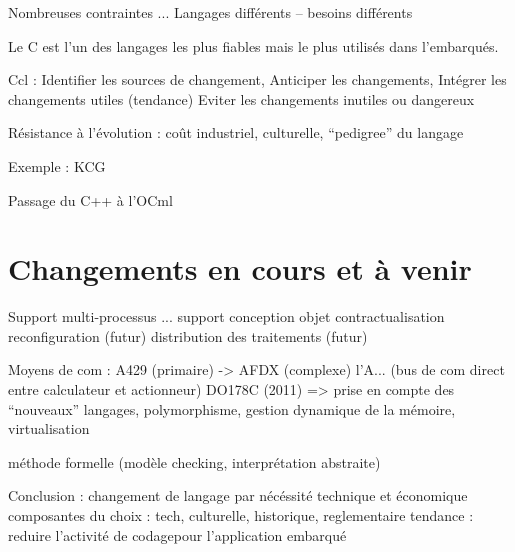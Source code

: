 \documentclass[a4paper,12pt]{article}
\begin{document}
Nombreuses contraintes ...
Langages différents -- besoins différents

Le C est l'un des langages les plus fiables mais le plus utilisés dans
l'embarqués.

Ccl :
Identifier les sources de changement,
Anticiper les changements,
Intégrer les changements utiles (tendance)
Eviter les changements inutiles ou dangereux 

Résistance à l'évolution : coût industriel, culturelle, ``pedigree''
du langage

Exemple : KCG

Passage du C++ à l'OCml

\section{Changements en cours et à venir}

Support multi-processus ...
support conception objet
contractualisation 
reconfiguration (futur)
distribution des traitements  (futur)

Moyens de com : A429 (primaire) -> AFDX (complexe) l'A... (bus de com
direct entre calculateur et actionneur)
DO178C (2011)
=> prise en compte des ``nouveaux'' langages, polymorphisme, gestion
dynamique de la mémoire, virtualisation

méthode formelle (modèle checking, interprétation abstraite)

Conclusion :
changement de langage par nécéssité technique et économique
composantes du choix : tech, culturelle, historique, reglementaire
tendance : reduire l'activité de codagepour l'application embarqué
\end{document}
